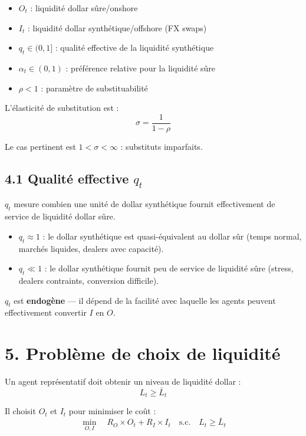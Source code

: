 \begin{itemize}
  \item $O_t$ : liquidité dollar sûre/onshore
  \item $I_t$ : liquidité dollar synthétique/offshore (FX swaps)
  \item $q_t \in (0,1]$ : qualité effective de la liquidité synthétique
  \item $\alpha_t \in (0,1)$ : préférence relative pour la liquidité sûre
  \item $\rho < 1$ : paramètre de substituabilité
\end{itemize}

L'élasticité de substitution est :
\[
\sigma = \frac{1}{1-\rho}
\]

Le cas pertinent est $1 < \sigma < \infty$ : substituts imparfaits.

\subsection*{4.1 Qualité effective $q_t$}

$q_t$ mesure combien une unité de dollar synthétique fournit
effectivement de service de liquidité dollar sûre.

\begin{itemize}
  \item $q_t \approx 1$ : le dollar synthétique est quasi-équivalent au dollar sûr
    (temps normal, marchés liquides, dealers avec capacité).
  \item $q_t \ll 1$ : le dollar synthétique fournit peu de service de liquidité
    sûre (stress, dealers contraints, conversion difficile).
\end{itemize}

$q_t$ est \textbf{endogène} — il dépend de la facilité avec laquelle les
agents peuvent effectivement convertir $I$ en $O$.

\section*{5. Problème de choix de liquidité}

Un agent représentatif doit obtenir un niveau de liquidité dollar :
\[
L_t \geq \bar{L}_t
\]

Il choisit $O_t$ et $I_t$ pour minimiser le coût :
\begin{equation}
\min_{O,I} \quad R_O \times O_t + R_I \times I_t
\quad \text{s.c.} \quad L_t \geq \bar{L}_t
\label{eq:cost-min}
\end{equation}

